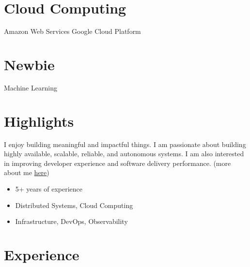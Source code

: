 \documentclass[]{cv-style}                     %
\begin{document}
\begin{aside}
\section{Cloud Computing}
Amazon Web Services
Google Cloud Platform
%
\section{Newbie}
Machine Learning
%
\end{aside}



\section{Highlights}

I enjoy building meaningful and impactful things.
I am passionate about building highly available, scalable, reliable, and autonomous systems.
I am also interested in improving developer experience and software delivery performance.
(more about me \href{https://milad.dev/about}{here})

\begin{itemize}
  \setlength{\itemsep}{-4pt}
  \item 5+ years of experience
  \item Distributed Systems, Cloud Computing
  \item Infrastructure, DevOps, Observability
\end{itemize}



\section{Experience}
\end{document}
